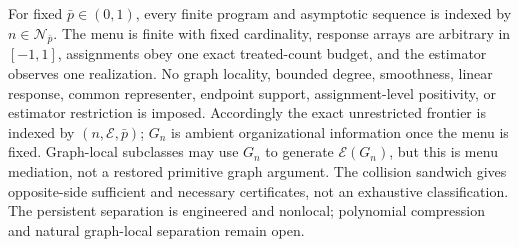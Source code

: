 For fixed \(\bar p\in(0,1)\), every finite program and asymptotic sequence is indexed by \(n\in\mathcal N_{\bar p}\). The menu is finite with fixed cardinality, response arrays are arbitrary in \([-1,1]\), assignments obey one exact treated-count budget, and the estimator observes one realization. No graph locality, bounded degree, smoothness, linear response, common representer, endpoint support, assignment-level positivity, or estimator restriction is imposed. Accordingly the exact unrestricted frontier is indexed by \((n,\mathcal E,\bar p)\); \(G_n\) is ambient organizational information once the menu is fixed. Graph-local subclasses may use \(G_n\) to generate \(\mathcal E(G_n)\), but this is menu mediation, not a restored primitive graph argument. The collision sandwich gives opposite-side sufficient and necessary certificates, not an exhaustive classification. The persistent separation is engineered and nonlocal; polynomial compression and natural graph-local separation remain open.